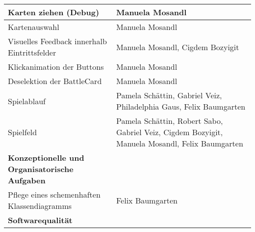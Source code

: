\begin{tabular}{|p{8cm}|p{10cm}|}
Karten ziehen (Debug) & Manuela Mosandl \\ \hline
Kartenauswahl & Manuela Mosandl \\ \hline
Visuelles Feedback innerhalb Eintrittsfelder & Manuela Mosandl, Cigdem Bozyigit \\ \hline
Klickanimation der Buttons & Manuela Mosandl \\ \hline
Deselektion der BattleCard & Manuela Mosandl \\ \hline
Spielablauf & Pamela Schättin, Gabriel Veiz, Philadelphia Gaus, Felix Baumgarten \\ \hline
Spielfeld & Pamela Schättin, Robert Sabo, Gabriel Veiz, Cigdem Bozyigit, Manuela Mosandl, Felix Baumgarten \\ \hline
\textbf{Konzeptionelle und Organisatorische Aufgaben} & \\ \hline
Pflege eines schemenhaften Klassendiagramms  & Felix Baumgarten \\ \hline
\textbf{Softwarequalität} & \\
\hline
\end{tabular}